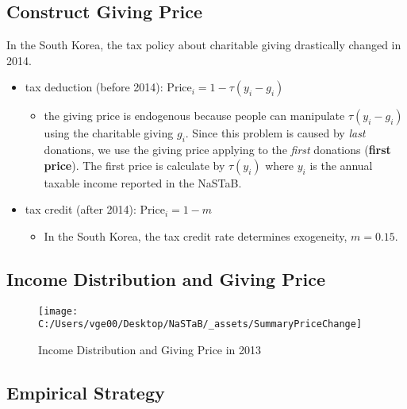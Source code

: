\documentclass[ review  , 3p ]{elsarticle}
\providecommand{\tightlist}{%
  \setlength{\itemsep}{0pt}\setlength{\parskip}{0pt}}
\begin{document}
  \hypertarget{construct-giving-price}{%
  \subsection{Construct Giving Price}\label{construct-giving-price}}
  
  In the South Korea, the tax policy about charitable giving drastically changed in 2014.
  
  \begin{itemize}
  \tightlist
  \item
    tax deduction (before 2014): \(\text{Price}_i = 1 - \tau(y_i - g_i)\)
  
    \begin{itemize}
    \tightlist
    \item
      the giving price is endogenous because people can manipulate \(\tau(y_i - g_i)\) using the charitable giving \(g_i\). Since this problem is caused by \emph{last} donations, we use the giving price applying to the \emph{first} donations (\textbf{first price}). The first price is calculate by \(\tau(y_i)\) where \(y_i\) is the annual taxable income reported in the NaSTaB.
    \end{itemize}
  \item
    tax credit (after 2014): \(\text{Price}_i = 1 - m\)
  
    \begin{itemize}
    \tightlist
    \item
      In the South Korea, the tax credit rate determines exogeneity, \(m = 0.15\).
    \end{itemize}
  \end{itemize}
  
  \hypertarget{income-distribution-and-giving-price}{%
  \subsection{Income Distribution and Giving Price}\label{income-distribution-and-giving-price}}
  
  \begin{figure}
  
  {\centering \texttt{[image: C:/Users/vge00/Desktop/NaSTaB/\_assets/SummaryPriceChange]} 
  
  }
  
  \caption{Income Distribution and Giving Price in 2013}\label{fig:unnamed-chunk-2}
  \end{figure}
  
  \hypertarget{empirical-strategy}{%
  \subsection{Empirical Strategy}\label{empirical-strategy}}
  
\end{document}
